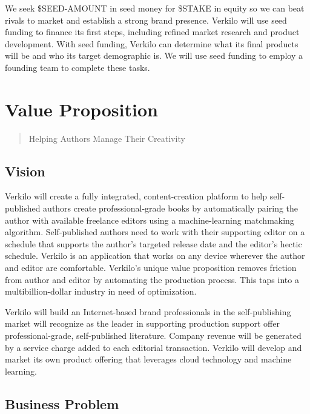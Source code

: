 \documentclass[10pt,openany]{book}
\begin{document}
We seek \$SEED-AMOUNT in seed money for \$STAKE in equity so we can beat
rivals to market and establish a strong brand presence. Verkilo will use
seed funding to finance its first steps, including refined market
research and product development. With seed funding, Verkilo can
determine what its final products will be and who its target demographic
is. We will use seed funding to employ a founding team to complete these
tasks.

\hypertarget{value-proposition}{%
\chapter{Value Proposition}\label{value-proposition}}

\begin{quote}
Helping Authors Manage Their Creativity
\end{quote}

\hypertarget{vision}{%
\section{Vision}\label{vision}}

Verkilo will create a fully integrated, content-creation platform to
help self-published authors create professional-grade books by
automatically pairing the author with available freelance editors using
a machine-learning matchmaking algorithm. Self-published authors need to
work with their supporting editor on a schedule that supports the
author's targeted release date and the editor's hectic schedule. Verkilo
is an application that works on any device wherever the author and
editor are comfortable. Verkilo's unique value proposition removes
friction from author and editor by automating the production process.
This taps into a multibillion-dollar industry in need of optimization.

Verkilo will build an Internet-based brand professionals in the
self-publishing market will recognize as the leader in supporting
production support offer professional-grade, self-published literature.
Company revenue will be generated by a service charge added to each
editorial transaction. Verkilo will develop and market its own product
offering that leverages cloud technology and machine learning.

\hypertarget{business-problem}{%
\section{Business Problem}\label{business-problem}}
\end{document}
